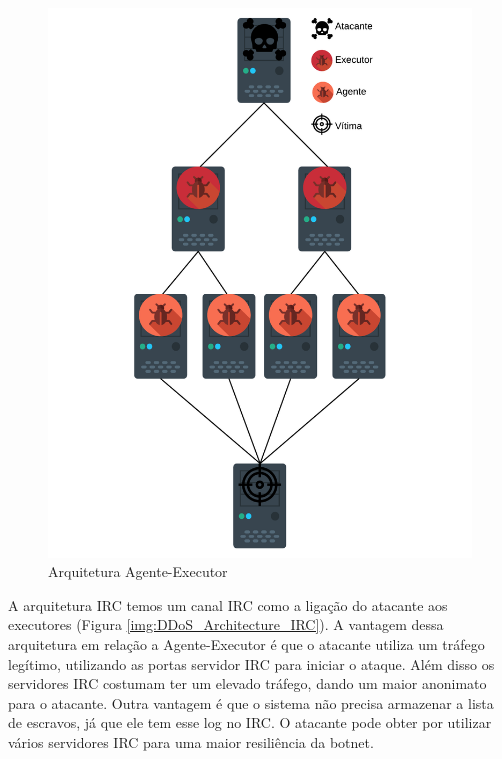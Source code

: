\begin{figure}[H]
     \centering
     \includegraphics[scale=0.5]{img/DDoS_MS.pdf}
     \caption{Arquitetura Agente-Executor}
     \label{img:DDoS_Architecture_MasterSlave}
\end{figure}

A arquitetura IRC temos um canal IRC como a ligação do atacante aos executores (Figura \ref{img:DDoS_Architecture_IRC}). A vantagem dessa arquitetura em relação a Agente-Executor é que o atacante utiliza um tráfego legítimo, utilizando as portas servidor IRC para iniciar o ataque. Além disso os servidores IRC costumam ter um elevado tráfego, dando um maior anonimato para o atacante. Outra vantagem é que o sistema não precisa armazenar a lista de escravos, já que ele tem esse log no IRC. O atacante pode obter por utilizar vários servidores IRC para uma maior resiliência da botnet.

